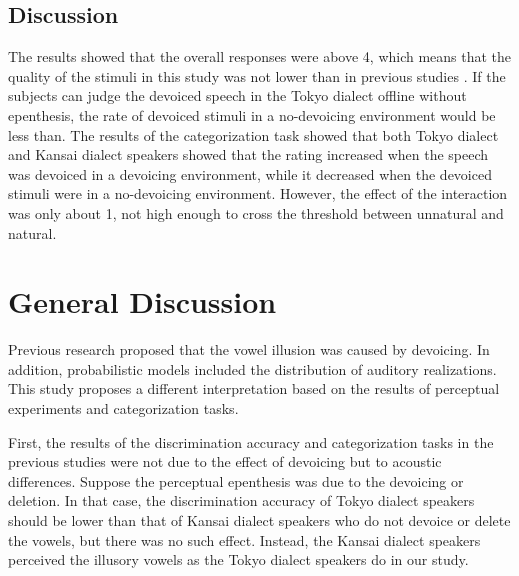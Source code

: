 \documentclass[a4paper,11pt,twocolumn]{article}
\begin{document}
\subsection{Discussion}

The results showed that the overall responses were above 4, which means that the quality of the stimuli in this study was not lower than in previous studies \cite{kilpatrick2018japanese}. If the subjects can judge the devoiced speech in the Tokyo dialect offline without epenthesis, the rate of devoiced stimuli in a no-devoicing environment would be less than. The results of the categorization task showed that both Tokyo dialect and Kansai dialect speakers showed that the rating increased when the speech was devoiced in a devoicing environment, while it decreased when the devoiced stimuli were in a no-devoicing environment. However, the effect of the interaction was only about 1, not high enough to cross the threshold between unnatural and natural.

\section{General Discussion}

Previous research proposed that the vowel illusion was caused by devoicing. In addition, probabilistic models included the distribution of auditory realizations. This study proposes a different interpretation based on the results of perceptual experiments and categorization tasks.

First, the results of the discrimination accuracy and categorization tasks in the previous studies were not due to the effect of devoicing but to acoustic differences. Suppose the perceptual epenthesis was due to the devoicing or deletion. In that case, the discrimination accuracy of Tokyo dialect speakers should be lower than that of Kansai dialect speakers who do not devoice or delete the vowels, but there was no such effect. Instead, the Kansai dialect speakers perceived the illusory vowels as the Tokyo dialect speakers do in our study.
\end{document}

